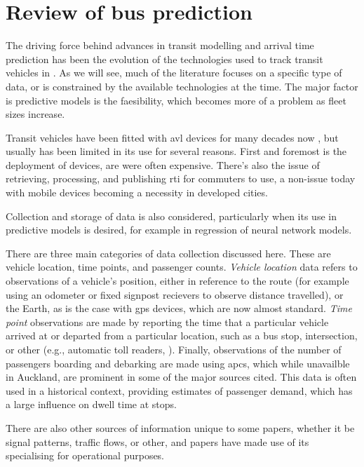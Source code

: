 \section{Review of bus prediction}
\label{sec:literature}


The driving force behind advances in transit modelling and arrival time prediction
has been the evolution of the technologies used to track transit vehicles in \rt{}.
As we will see, much of the literature focuses on a specific type of data,
or is constrained by the available technologies at the time.
The major factor is predictive models is the \rt{} faesibility,
which becomes more of a problem as fleet sizes increase.


Transit vehicles have been fitted with \gls{avl} devices for many decades now \citep{TCRP_1997},
but usually has been limited in its use for several reasons.
First and foremost is the deployment of devices, are were often expensive.
There's also the issue of retrieving, processing, and publishing \gls{rti} for commuters to use,
a non-issue today with mobile devices becoming a necessity in developed cities.


Collection and storage of data is also considered,
particularly when its use in predictive models is desired,
for example in regression of neural network models.


There are three main categories of data collection discussed here.
These are vehicle location, time points, and passenger counts.
\emph{Vehicle location} data refers to observations of a vehicle's position,
either in reference to the route
(for example using an odometer or fixed signpost recievers to observe distance travelled),
or the Earth, as is the case with \gls{gps} devices,
which are now almost standard.
\emph{Time point} observations are made by reporting the time that a particular vehicle
arrived at or departed from a particular location,
such as a bus stop, intersection, or other (e.g., automatic toll readers, \citep{Yu_2011}).
Finally, observations of the number of passengers boarding and debarking are made using \glspl{apc},
which while unavailble in Auckland, are prominent in some of the major sources cited.
This data is often used in a historical context,
providing estimates of passenger demand, which has a large influence on dwell time at stops.


There are also other sources of information unique to some papers,
whether it be signal patterns, traffic flows, or other,
and papers have made use of its specialising for operational purposes.


